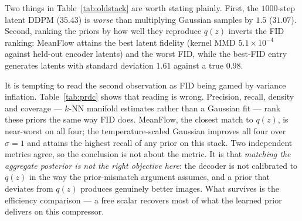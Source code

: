 \documentclass[sigconf,nonacm]{acmart}
\begin{document}
Two things in Table~\ref{tab:oldstack} are worth stating plainly. First, the
$1000$-step latent DDPM ($35.43$) is \emph{worse} than multiplying Gaussian
samples by $1.5$ ($31.07$). Second, ranking the priors by how well they
reproduce $q(z)$ inverts the FID ranking: MeanFlow attains the best latent
fidelity (kernel MMD $5.1\times10^{-4}$ against held-out encoder latents) and
the worst FID, while the best-FID entry generates latents with standard
deviation $1.61$ against a true $0.98$.

It is tempting to read the second observation as FID being gamed by variance
inflation. Table~\ref{tab:prdc} shows that reading is wrong. Precision, recall,
density and coverage --- $k$-NN manifold estimates rather than a Gaussian fit
--- rank these priors the same way FID does. MeanFlow, the closest match to
$q(z)$, is near-worst on all four; the temperature-scaled Gaussian improves all
four over $\sigma{=}1$ and attains the highest recall of any prior on this
stack. Two independent metrics agree, so the conclusion is not about the
metric. It is that \emph{matching the aggregate posterior is not the right
objective here}: the decoder is not calibrated to $q(z)$ in the way the
prior-mismatch argument assumes, and a prior that deviates from $q(z)$ produces
genuinely better images. What survives is the efficiency comparison --- a free
scalar recovers most of what the learned prior delivers on this compressor.
\end{document}
